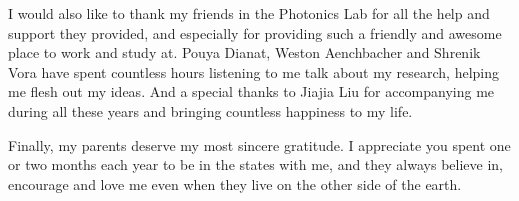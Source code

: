 \begin{preamble}
\begin{acknowledgments}
I would also like to thank my friends in the Photonics Lab for all the help and
support they provided, and especially for providing such a friendly and awesome
place to work and study at. Pouya Dianat, Weston Aenchbacher and Shrenik Vora
have spent countless hours listening to me talk about my research, helping me
flesh out my ideas. And a special thanks to Jiajia Liu for accompanying me
during all these years and bringing countless happiness to my life.

Finally, my parents deserve my most sincere gratitude. I appreciate you spent
one or two months each year to be in the states with me, and they always
believe in, encourage and love me even when they live on the other side of the
earth.

\end{acknowledgments}

\iffinal{}{\newpage}

\tableofcontents 
\iffinal{}{\newpage}

\listoftables
\iffinal{}{\newpage}

\listoffigures 
\iffinal{}{\newpage}

\begin{abstract}


\end{abstract}
\end{preamble}
